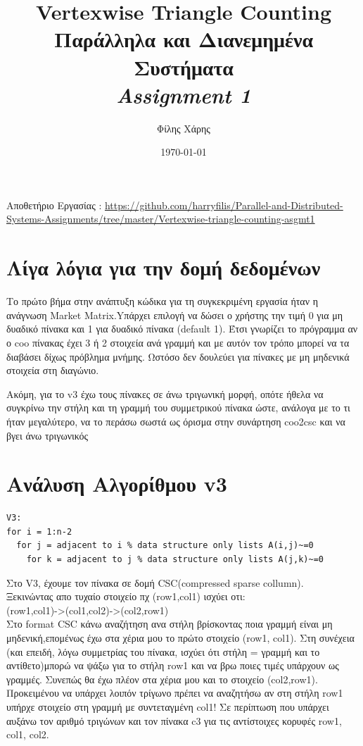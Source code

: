 \documentclass[10pt]{report}
\title{
Vertexwise Triangle Counting \\ 
\large Παράλληλα και Διανεμημένα Συστήματα\\ 
\textit{Assignment 1}}
\author{Φίλης Χάρης}
\date{\today}
\begin{document}
\maketitle
Αποθετήριο Εργασίας : 
\newline
\href{https://github.com/harryfilis/Parallel_and_Distributed_Systems_Assignments/tree/master/Vertexwise_triangle_counting-asgmt1}{https://github.com/harryfilis/Parallel-and-Distributed-Systems-Assignments/tree/master/Vertexwise-triangle-counting-asgmt1}
\section{\color{blue}Λίγα λόγια για την δομή δεδομένων}
Το πρώτο βήμα στην ανάπτυξη κώδικα για τη συγκεκριμένη εργασία ήταν η ανάγνωση Market Matrix.Yπάρχει επιλογή να δώσει ο χρήστης την τιμή 0 για μη δυαδικό πίνακα και 1 για δυαδικό πίνακα (default 1). Έτσι γνωρίζει το πρόγραμμα αν ο coo πίνακας έχει 3 ή 2 στοιχεία ανά γραμμή και με αυτόν τον τρόπο μπορεί να τα διαβάσει δίχως πρόβλημα μνήμης. Ωστόσο δεν δουλεύει για πίνακες με μη μηδενικά στοιχεία στη διαγώνιο. 

Ακόμη, για το v3 έχω τους πίνακες σε άνω τριγωνική μορφή, οπότε ήθελα να συγκρίνω την στήλη και τη γραμμή του συμμετρικού πίνακα ώστε, ανάλογα με το τι ήταν μεγαλύτερο, να το περάσω σωστά ως όρισμα στην συνάρτηση coo2csc και να βγει άνω τριγωνικός

\section{\color{blue} Ανάλυση Αλγορίθμου  v3}
\begin{lstlisting}
V3:
for i = 1:n-2
  for j = adjacent to i % data structure only lists A(i,j)~=0
    for k = adjacent to j % data structure only lists A(j,k)~=0
\end{lstlisting}
Στο V3, έχουμε τον πίνακα σε δομή CSC(compressed sparse collumn).
\\
Ξεκινώντας απο τυχαίο στοιχείο πχ (row1,col1) ισχύει οτι:\\
(row1,col1)->(col1,col2)->(col2,row1)\\
Στο format CSC κάνω αναζήτηση ανα στήλη βρίσκοντας ποια γραμμή είναι μη μηδενική,επομένως έχω στα χέρια μου το πρώτο στοιχείο (row1, col1). Στη συνέχεια (και επειδή, λόγω συμμετρίας του πίνακα, ισχύει ότι στήλη = γραμμή και το αντίθετο)μπορώ να ψάξω για το στήλη row1 και να βρω ποιες τιμές υπάρχουν ως γραμμές. Συνεπώς θα έχω πλέον στα χέρια μου και το στοιχείο (col2,row1). Προκειμένου να υπάρχει λοιπόν τρίγωνο πρέπει να αναζητήσω αν στη στήλη row1 υπήρχε στοιχείο στη γραμμή με συντεταγμένη col1!  Σε περίπτωση που υπάρχει αυξάνω τον αριθμό τριγώνων και τον πίνακα c3 για τις αντίστοιχες κορυφές row1, col1, col2.
\end{document}
